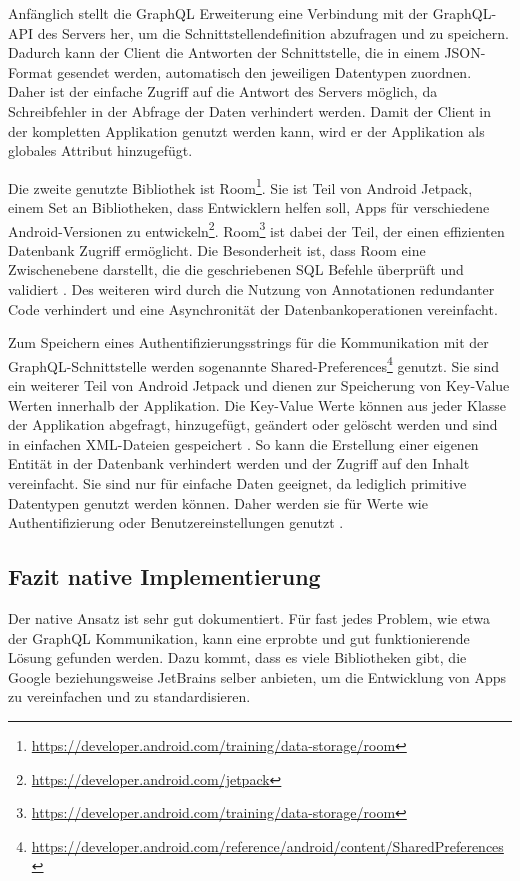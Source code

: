 Anfänglich stellt die GraphQL Erweiterung eine Verbindung mit der GraphQL-API des Servers her, um die Schnittstellendefinition abzufragen und zu speichern. Dadurch kann der Client die Antworten der Schnittstelle, die in einem JSON-Format gesendet werden, automatisch den jeweiligen Datentypen zuordnen. Daher ist der einfache Zugriff auf die Antwort des Servers möglich, da Schreibfehler in der Abfrage der Daten verhindert werden.
Damit der Client in der kompletten Applikation genutzt werden kann, wird er der Applikation als globales Attribut hinzugefügt.

Die zweite genutzte Bibliothek ist Room\footnote{\url{https://developer.android.com/training/data-storage/room}}. Sie ist Teil von Android Jetpack, einem Set an Bibliotheken, dass Entwicklern helfen soll, Apps für verschiedene Android-Versionen zu entwickeln\footnote{\url{https://developer.android.com/jetpack}}. Room\footnote{\url{https://developer.android.com/training/data-storage/room}} ist dabei der Teil, der einen effizienten Datenbank Zugriff ermöglicht.
Die Besonderheit ist, dass Room eine Zwischenebene darstellt, die die geschriebenen SQL Befehle überprüft und validiert \cite{Android_Room}. Des weiteren wird durch die Nutzung von Annotationen redundanter Code verhindert und eine Asynchronität der Datenbankoperationen vereinfacht.

Zum Speichern eines Authentifizierungsstrings für die Kommunikation mit der GraphQL-\break Schnittstelle werden sogenannte Shared-Preferences\footnote{\url{https://developer.android.com/reference/android/content/SharedPreferences}} genutzt. 
Sie sind ein weiterer Teil von Android Jetpack und dienen zur Speicherung von Key-Value Werten innerhalb der Applikation. 
Die Key-Value Werte können aus jeder Klasse der Applikation abgefragt, hinzugefügt, geändert oder gelöscht werden und sind in einfachen XML-Dateien gespeichert \cite{Shared_Preferences_Android}. 
So kann die Erstellung einer eigenen Entität in der Datenbank verhindert werden und der Zugriff auf den Inhalt vereinfacht. 
Sie sind nur für einfache Daten geeignet, da lediglich primitive Datentypen genutzt werden können. 
Daher werden sie für Werte wie Authentifizierung oder Benutzereinstellungen genutzt \cite{Shared_Preferences_Android}.


\subsection{Fazit native Implementierung}
Der native Ansatz ist sehr gut dokumentiert. Für fast jedes Problem, wie etwa der GraphQL Kommunikation, kann eine erprobte und gut funktionierende Lösung gefunden werden. Dazu kommt, dass es viele Bibliotheken gibt, die Google beziehungsweise JetBrains selber anbieten, um die Entwicklung von Apps zu vereinfachen und zu standardisieren.

